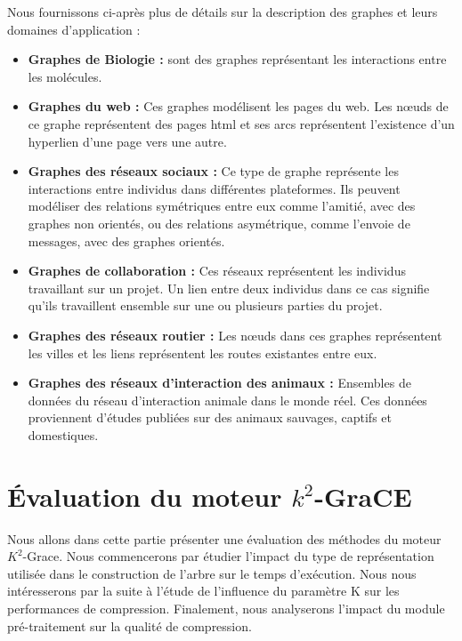 	
	Nous fournissons ci-après plus de détails sur la description des graphes et leurs domaines d'application :
	\begin{itemize}
	
	
	\item \textbf{Graphes de Biologie :} sont des graphes représentant les interactions entre les molécules.
	
	\item \textbf{Graphes du web :} Ces graphes  modélisent les pages du web. Les nœuds de ce graphe représentent des pages html et ses arcs représentent l'existence d'un hyperlien d'une page vers une autre.  

	\item \textbf{Graphes des réseaux sociaux :} Ce type de graphe représente les interactions entre individus dans différentes plateformes. Ils peuvent modéliser des relations symétriques entre eux comme l'amitié, avec des graphes non orientés, ou des relations asymétrique, comme l'envoie de messages, avec des graphes orientés.

	\item \textbf{Graphes de collaboration :} Ces réseaux représentent les individus travaillant sur un projet. Un lien entre deux individus dans ce cas signifie qu'ils travaillent ensemble sur une ou plusieurs parties du projet. 

	\item \textbf{Graphes des réseaux routier :}  Les nœuds dans ces graphes représentent les villes et les liens représentent les routes existantes entre eux.
	
	\item \textbf{Graphes des réseaux d'interaction des animaux :} Ensembles de données du réseau d'interaction animale dans le monde réel. Ces données proviennent d'études publiées sur des animaux sauvages, captifs et domestiques.
	
	
	\end{itemize}
	
	\section{Évaluation du moteur $k^2$-GraCE}
	Nous allons dans cette partie présenter une évaluation des méthodes du moteur $K^2$-Grace. 
	Nous commencerons par étudier l'impact du type de représentation utilisée dans le construction de l'arbre sur le temps d'exécution. Nous nous intéresserons par la suite à l'étude de l'influence du paramètre K sur les performances de compression.
	Finalement, nous  analyserons  l'impact  du module pré-traitement sur la qualité de compression. 

